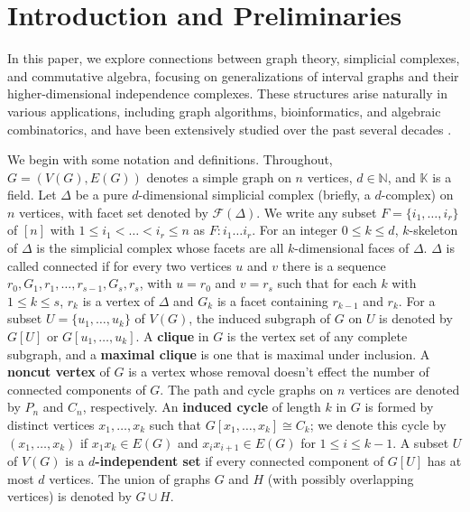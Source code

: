 \documentclass[12pt,reqno]{amsart}
\theoremstyle{plain}
\theoremstyle{definition}
\numberwithin{equation}{section}
\begin{document}


\maketitle
\setcounter{tocdepth}{1}



\section{Introduction and Preliminaries}
In this paper, we explore connections between graph theory, simplicial complexes, and commutative algebra, focusing on generalizations of interval graphs and their higher-dimensional independence complexes. These structures arise naturally in various applications, including graph algorithms, bioinformatics, and algebraic combinatorics, and have been extensively studied over the past several decades \cite{B+S+V, Herzog2, Gardi, Herzog1, Fahimeh, R2}.

We begin with some notation and definitions. Throughout, $G = (V(G), E(G))$ denotes a simple graph on $n$ vertices, $d \in \mathbb{N}$, and $\mathbb{K}$ is a field. Let $\Delta$ be a pure $d$-dimensional simplicial complex (briefly, a $d$-complex) on $n$ vertices, with facet set denoted by $\mathcal{F}(\Delta)$.  We write any subset $F=\{i_1, \dots , i_r\}$ of $[n]$ with $1\leq i_1 < \dots < i_r \leq n$ as $F: i_1 \dots i_r$.   For an integer $0\leq k \leq d$, $k$-skeleton of $\Delta$ is the simplicial complex whose facets are all $k$-dimensional faces of $\Delta$. $\Delta$ is called connected if for every two vertices $u$ and $v$ there is a sequence $r_0, G_1, r_1, \dots , r_{s-1}, G_s, r_s$, with $u=r_0$ and $v=r_s$ such that for each $k$ with $1\leq k \leq s$, $r_k$ is a vertex of $\Delta$ and $G_k$ is a facet containing $r_{k-1}$ and $r_k$. For a subset $U = \{u_1, \dots, u_k\}$ of $V(G)$, the induced subgraph of $G$ on $U$ is denoted by $G[U]$ or $G[u_1, \dots, u_k]$. A \textbf{clique} in $G$ is the vertex set of any complete subgraph, and a \textbf{maximal clique} is one that is maximal under inclusion. A \textbf{noncut vertex} of $G$ is a vertex whose removal doesn't effect the number of connected components of $G$. The path and cycle graphs on $n$ vertices are denoted by $P_n$ and $C_n$, respectively. An \textbf{induced cycle} of length $k$ in $G$ is formed by distinct vertices $x_1, \dots, x_k$ such that $G[x_1, \dots, x_k] \cong C_k$; we denote this cycle by $(x_1, \dots, x_k)$ if $x_1 x_k \in E(G)$ and $x_i x_{i+1} \in E(G)$ for $1 \leq i \leq k-1$. A subset $U $ of $V(G)$ is a \textbf{$d$-independent set} if every connected component of $G[U]$ has at most $d$ vertices. The union of graphs $G$ and $H$ (with possibly overlapping vertices) is denoted by $G \cup H$. 
\end{document}
